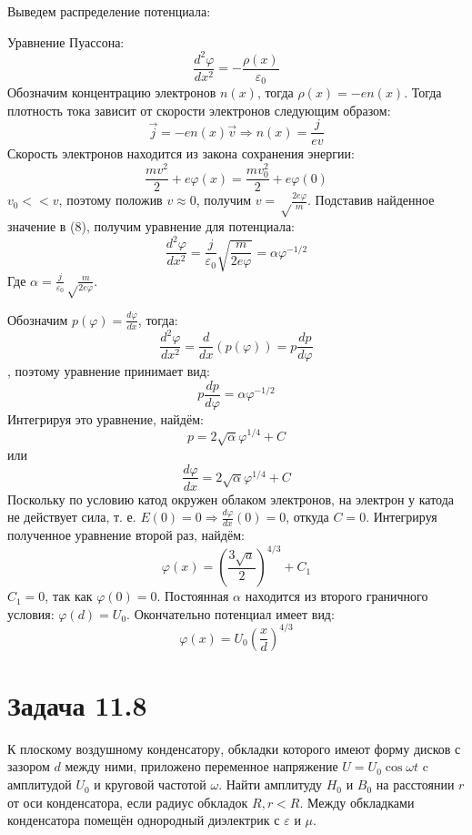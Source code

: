 \documentclass[11pt]{article}
\begin{document}
Выведем распределение потенциала:

Уравнение Пуассона:
\begin{equation}
\frac{d^2\varphi}{dx^2} = -\frac{\rho(x)}{\varepsilon_0}
\end{equation}
Обозначим концентрацию электронов \(n(x)\), тогда \(\rho(x) = -en(x)\). Тогда плотность тока зависит от скорости
электронов следующим образом:
$$\vec j = -en(x)\vec v \Rightarrow n(x) = \frac{j}{ev}$$
Скорость электронов находится из закона сохранения энергии:
$$\frac{mv^2}2 + e\varphi(x) = \frac{mv_0^2}2 + e\varphi(0)$$
\(v_0 << v\), поэтому положив \(v \approx 0\), получим \(v = \sqrt\frac{2e\varphi}m\). Подставив найденное значение в (8),
получим уравнение для потенциала:
$$\frac{d^2\varphi}{dx^2} = \frac{j}{\varepsilon_0}\sqrt{\frac{m}{2e\varphi}} = \alpha\varphi^{-1/2}$$
Где \(\alpha = \frac{j}{\varepsilon_0}\sqrt\frac{m}{2e\varphi}\).

Обозначим \(p(\varphi) = \frac{d\varphi}{dx}\), тогда:
$$\frac{d^2\varphi}{dx^2} = \frac{d}{dx}(p(\varphi)) = p\frac{dp}{d\varphi}$$, поэтому уравнение принимает вид:
$$p\frac{dp}{d\varphi} = \alpha\varphi^{-1/2}$$
Интегрируя это уравнение, найдём:
$$p = 2\sqrt\alpha\varphi^{1/4} + C$$
или
$$\frac{d\varphi}{dx} = 2\sqrt\alpha\varphi^{1/4} + C$$
Поскольку по условию катод окружен облаком электронов, на электрон у катода не действует сила, т. е. \(E(0) = 0
\Rightarrow \frac{d\varphi}{dx}(0) = 0\), откуда \(C = 0\).
Интегрируя полученное уравнение второй раз, найдём:
$$\varphi(x) = \left(\frac{3\sqrt a}2\right)^{4/3} + C_1$$
\(C_1 = 0\), так как \(\varphi(0) = 0\). Постоянная \(\alpha\) находится из второго граничного условия: \(\varphi(d) = U_0\).
Окончательно потенциал имеет вид:
$$\varphi(x) = U_0\left(\frac{x}d\right)^{4/3}$$
\section{Задача 11.8}
\label{sec:org91bd35a}
К плоскому воздушному конденсатору, обкладки которого имеют форму дисков с зазором \(d\) между ними, приложено переменное
напряжение \(U = U_0\cos\omega t\) c амплитудой \(U_0\) и круговой частотой \(\omega\). Найти амплитуду \(H_0\) и \(B_0\) на
расстоянии \(r\) от оси конденсатора, если радиус обкладок \(R, r < R\). Между обкладками конденсатора помещён однородный
диэлектрик с \(\varepsilon\) и \(\mu\).
\end{document}
